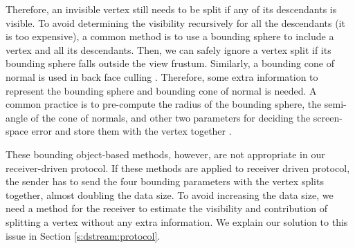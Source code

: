     Therefore, an invisible vertex still needs to be split if any of its descendants is visible. 
    To avoid determining the visibility %
    recursively for all the descendants (it is too expensive), 
    a common method is to use a bounding sphere to include a vertex and all its descendants.
    Then, we can safely ignore a vertex split if its bounding sphere
    falls outside the view frustum.
    Similarly, a bounding cone of normal is used in back face culling \cite{258843}.
    Therefore, some extra information to represent the bounding sphere
    and bounding cone of normal is needed. A common practice is to
    pre-compute the radius of the bounding sphere, %
    the semi-angle of the cone of normals, %
    and other two parameters %
    for deciding the screen-space error
    and store them with the vertex together \cite{258843, kim:view}.
    
    These bounding object-based methods, however, are not appropriate
    in our receiver-driven protocol. 
    If these methods are applied to receiver driven protocol, the sender has to send
    the four bounding parameters with the vertex splits together, almost doubling 
    the data size. 
    To avoid increasing the data size, 
    we need a method for the receiver to estimate the visibility and contribution of 
    splitting a vertex without any extra information.
    We explain our solution to this issue in Section \ref{s:dstream:protocol}.

